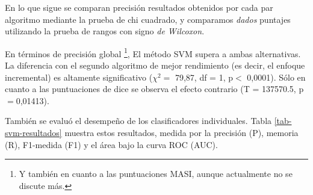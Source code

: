 



En lo que sigue se comparan precisi\'on resultados obtenidos por cada par algoritmo mediante la prueba de chi cuadrado, y comparamos {\em dados} puntajes utilizando la prueba de rangos con signo {\em de Wilcoxon}.

En t\'erminos de precisi\'on global \footnote{Y tambi\'en en cuanto a las puntuaciones MASI, aunque actualmente no se discute m\'as.}, El m\'etodo SVM supera a ambas alternativas. La diferencia con el segundo algoritmo de mejor rendimiento (es decir, el enfoque incremental) es altamente significativo ($\chi^{2}=$ 79,87, df = 1, p$<$ 0,0001). S\'olo en cuanto a las puntuaciones de dice se observa el efecto contrario (T = 137570.5, p$=$0,01413).

Tambi\'en se evalu\'o el desempe\~no de los clasificadores individuales. Tabla \ref{tab-svm-resultados} muestra estos resultados, medida por la precisi\'on (P), memoria (R), F1-medida (F1) y el \'area bajo la curva ROC (AUC).

